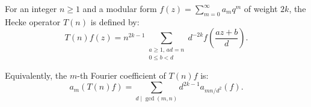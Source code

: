 For an integer $n \geq 1$ and a modular form $f(z) = \sum_{m=0}^{\infty} a_m q^m$ of weight $2k$, the Hecke operator $T(n)$ is defined by:
$$T(n)f(z) = n^{2k-1} \sum_{\substack{a \geq 1,\, ad = n \\ 0 \leq b < d}} d^{-2k} f\left(\frac{az + b}{d}\right).$$

Equivalently, the $m$-th Fourier coefficient of $T(n)f$ is:
$$a_m(T(n)f) = \sum_{d \mid \gcd(m,n)} d^{2k-1} a_{mn/d^2}(f).$$
